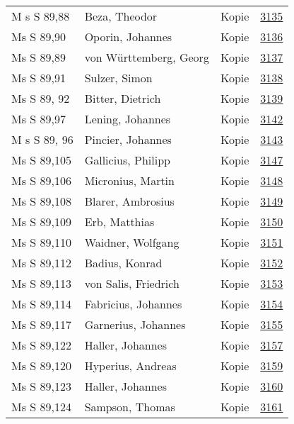 \documentclass[10pt,a4paper,landscape]{report}
\begin{document}
\begin{longtable}{p{16cm}p{4cm}lr}
M s  S 89,88	&	Beza, Theodor	&	Kopie	&	\href{http://130.60.24.72/assignment/3135}{3135}\\
Ms S 89,90	&	Oporin, Johannes	&	Kopie	&	\href{http://130.60.24.72/assignment/3136}{3136}\\
Ms S 89,89	&	von Württemberg, Georg	&	Kopie	&	\href{http://130.60.24.72/assignment/3137}{3137}\\
Ms S 89,91	&	Sulzer, Simon	&	Kopie	&	\href{http://130.60.24.72/assignment/3138}{3138}\\
Ms S 89, 92	&	Bitter, Dietrich	&	Kopie	&	\href{http://130.60.24.72/assignment/3139}{3139}\\
Ms S 89,97	&	Lening, Johannes	&	Kopie	&	\href{http://130.60.24.72/assignment/3142}{3142}\\
M s S 89, 96	&	Pincier, Johannes	&	Kopie	&	\href{http://130.60.24.72/assignment/3143}{3143}\\
Ms S 89,105	&	Gallicius, Philipp	&	Kopie	&	\href{http://130.60.24.72/assignment/3147}{3147}\\
Ms S 89,106	&	Micronius, Martin	&	Kopie	&	\href{http://130.60.24.72/assignment/3148}{3148}\\
Ms S 89,108	&	Blarer, Ambrosius	&	Kopie	&	\href{http://130.60.24.72/assignment/3149}{3149}\\
Ms S 89,109	&	Erb, Matthias	&	Kopie	&	\href{http://130.60.24.72/assignment/3150}{3150}\\
Ms S 89,110	&	Waidner, Wolfgang	&	Kopie	&	\href{http://130.60.24.72/assignment/3151}{3151}\\
Ms S 89,112	&	Badius, Konrad	&	Kopie	&	\href{http://130.60.24.72/assignment/3152}{3152}\\
Ms S 89,113	&	von Salis, Friedrich	&	Kopie	&	\href{http://130.60.24.72/assignment/3153}{3153}\\
Ms S 89,114	&	Fabricius, Johannes	&	Kopie	&	\href{http://130.60.24.72/assignment/3154}{3154}\\
Ms S 89,117	&	Garnerius, Johannes	&	Kopie	&	\href{http://130.60.24.72/assignment/3155}{3155}\\
Ms S 89,122	&	Haller, Johannes	&	Kopie	&	\href{http://130.60.24.72/assignment/3157}{3157}\\
Ms S 89,120	&	Hyperius, Andreas	&	Kopie	&	\href{http://130.60.24.72/assignment/3159}{3159}\\
Ms S 89,123	&	Haller, Johannes	&	Kopie	&	\href{http://130.60.24.72/assignment/3160}{3160}\\
Ms S 89,124	&	Sampson, Thomas	&	Kopie	&	\href{http://130.60.24.72/assignment/3161}{3161}\\

\end{longtable}
\end{document}
